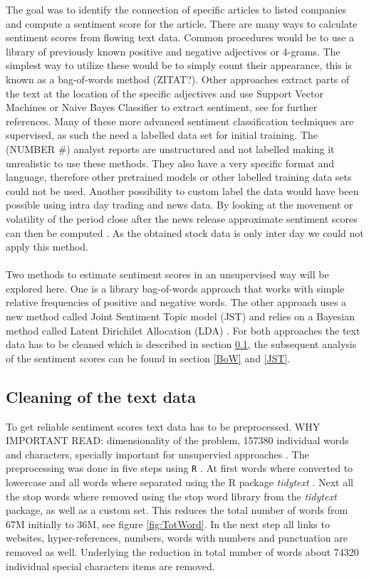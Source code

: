 The goal was to identify the connection of specific articles to listed companies and compute a sentiment score for the article. There are many ways to calculate sentiment scores from flowing text data. Common procedures would be to use a library of previously known positive and negative adjectives or 4-grams. The simplest way to utilize these would be to simply count their appearance, this is known as a bag-of-words method (ZITAT?). Other approaches extract parts of the text at the location of the specific adjectives and use Support Vector Machines or Naive Bayes Classifier to extract sentiment, see \citet{westerski2007sentiment} for further references. Many of these more advanced sentiment classification techniques are supervised, as such the need a labelled data set for initial training. The (NUMBER #) analyst reports are unstructured and not labelled making it unrealistic to use these methods. They also have a very specific format and language, therefore other pretrained models or other labelled training data sets could not be used. Another possibility to custom label the data would have been possible using intra day trading and news data. By looking at the movement or volatility of the period close after the news release approximate sentiment scores can then be computed \citep{robertson2007news}. As the obtained stock data is only inter day we could not apply this method.
\\ \\
Two methods to estimate sentiment scores in an unsupervised way will be explored here. One is a library bag-of-words approach that works with simple relative frequencies of positive and negative words. The other approach uses a new method called Joint Sentiment Topic model (JST) \citep{lin2009joint} and relies on a Bayesian method called Latent Dirichilet Allocation (LDA)  \citep{blei2003latent}. For both approaches the text data has to be cleaned which is described in section \ref{cleaningText}, the subsequent analysis of the sentiment scores can be found in section \ref{BoW} and \ref{JST}.

\subsection{Cleaning of the text data}\label{cleaningText}
To get reliable sentiment scores text data has to be preprocessed. WHY IMPORTANT READ: dimensionality of the problem, 157380 individual words and characters,  specially important for unsupervied approaches \citep{HADDI201326}. The preprocessing was done in five steps using \texttt{R} \citep{Rproject}. At first words where converted to lowercase and all words where separated using the R package \textit{tidytext} \citep{tidytext}. Next all the stop words where removed using the stop word library from the \textit{tidytext} package, as well as a custom set. This reduces the total number of words from 67M initially to 36M, see figure \ref{fig:TotWord}. In the next step all links to websites, hyper-references, numbers, words with numbers and punctuation are removed as well. Underlying the reduction in total number of words about 74320 individual special characters items are removed. 

